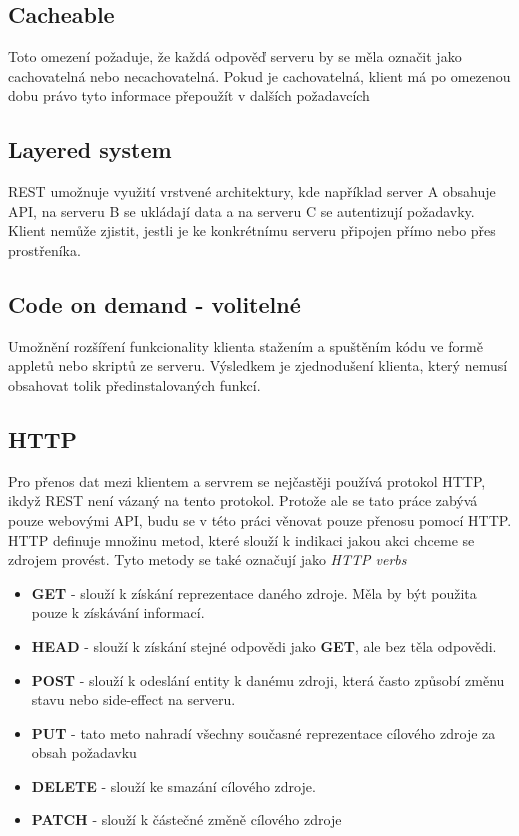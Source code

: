 \documentclass[thesis=M,czech]{FITthesis}[2019/12/23]
\begin{document}
\subsection{Cacheable}
Toto omezení požaduje, že každá odpověď serveru by se měla označit jako cachovatelná nebo necachovatelná. Pokud je cachovatelná, klient má po omezenou dobu právo tyto informace přepoužít v dalších požadavcích

\subsection{Layered system}
REST umožnuje využití vrstvené architektury, kde například server A obsahuje API, na serveru B se ukládají data a na serveru C se autentizují požadavky. Klient nemůže zjistit, jestli je ke konkrétnímu serveru připojen přímo nebo přes prostřeníka.

\subsection{Code on demand - volitelné}
Umožnění rozšíření funkcionality klienta stažením a spuštěním kódu ve formě appletů nebo skriptů ze serveru. Výsledkem je zjednodušení klienta, který nemusí obsahovat tolik předinstalovaných funkcí.

\subsection{HTTP}
Pro přenos dat mezi klientem a servrem se nejčastěji používá protokol HTTP, ikdyž REST není vázaný na tento protokol. Protože ale se tato práce zabývá pouze webovými API, budu se v této práci věnovat pouze přenosu pomocí HTTP.
HTTP definuje množinu metod, které slouží k indikaci jakou akci chceme se zdrojem provést. Tyto metody se také označují jako \textit{HTTP verbs} \cite{http_metods}

\begin{itemize}
    \item \textbf{GET} - slouží k získání reprezentace daného zdroje. Měla by být použita pouze k získávání informací.
    \item \textbf{HEAD} - slouží k získání stejné odpovědi jako \textbf{GET}, ale bez těla odpovědi.
    \item \textbf{POST} - slouží k odeslání entity k danému zdroji, která často způsobí změnu stavu nebo side-effect na serveru.
    \item \textbf{PUT} - tato meto nahradí všechny současné reprezentace cílového zdroje za obsah požadavku
    \item \textbf{DELETE} - slouží ke smazání cílového zdroje.
    \item \textbf{PATCH} - slouží k částečné změně cílového zdroje
\end{itemize}
\end{document}

